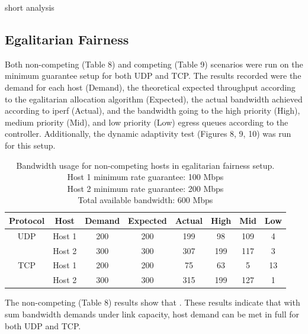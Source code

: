 \documentclass[accepted,single]{gipaper}
\begin{document}
short analysis

\subsection{Egalitarian Fairness}
\label{dba_egal}

Both non-competing (Table 8) and competing (Table 9) scenarios were run on the minimum guarantee setup for both UDP and TCP. The results recorded were the demand for each host (Demand), the theoretical expected throughput according to the egalitarian allocation algorithm (Expected), the actual bandwidth achieved according to iperf (Actual), and the bandwidth going to the high priority (High), medium priority (Mid), and low priority (Low) egress queues according to the controller. Additionally, the dynamic adaptivity test (Figures 8, 9, 10) was run for this setup.

\begin{table}[h]
	\label{egal_nc}
	\vspace{-2mm}
	\begin{center}
		\begin{small}
		\setlength\tabcolsep{1.5pt}
			\begin{tabular}{cccccccc}
				Protocol & Host & Demand & Expected & Actual & High & Mid & Low\\
				\hline
				UDP & Host 1 & 200 & 200 & 199 & 98 & 109 & 4\\
				    & Host 2 & 300 & 300 & 307 & 199 & 117 & 3\\
				\hline
				TCP & Host 1 & 200 & 200 & 75 & 63 & 5 & 13\\
				    & Host 2 & 300 & 300 & 315 & 199 & 127 & 1\\
			\end{tabular}
		\end{small}
	\end{center}
	\caption{Bandwidth usage for non-competing hosts in egalitarian fairness setup.\\
	Host 1 minimum rate guarantee: 100 Mbps\\
	Host 2 minimum rate guarantee: 200 Mbps\\	
	Total available bandwidth: 600 Mbps}
	\vspace{-3mm}
\end{table}

The non-competing (Table 8) results show that . These results indicate that with sum bandwidth demands under link capacity, host demand can be met in full for both UDP and TCP.
\end{document}
